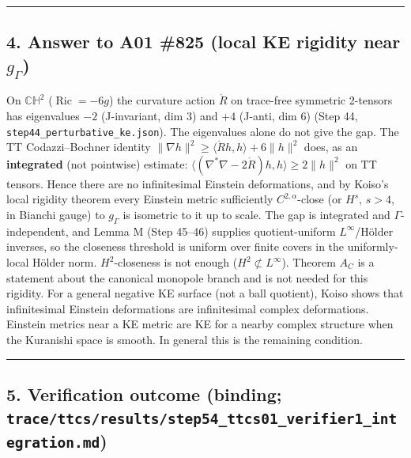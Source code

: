 \documentclass[
  10pt,
]{report}
\begin{document}
\begin{center}\rule{0.5\linewidth}{0.5pt}\end{center}

\hypertarget{answer-to-a01-825-local-ke-rigidity-near-g_gamma}{%
\subsection{\texorpdfstring{4. Answer to A01 \#825 (local KE rigidity
near
\(g_\Gamma\))}{4. Answer to A01 \#825 (local KE rigidity near g\_\textbackslash Gamma)}}\label{answer-to-a01-825-local-ke-rigidity-near-g_gamma}}

On \(\mathbb{CH}^2\) (\(\operatorname{Ric}=-6g\)) the curvature action
\(\mathring R\) on trace-free symmetric 2-tensors has eigenvalues \(-2\)
(J-invariant, dim 3) and \(+4\) (J-anti, dim 6) (Step 44,
\texttt{step44\_perturbative\_ke.json}). The eigenvalues alone do not
give the gap. The TT Codazzi--Bochner identity
\(\|\nabla h\|^2\ge\langle\mathring Rh,h\rangle+6\|h\|^2\) does, as an
\textbf{integrated} (not pointwise) estimate:
\(\langle(\nabla^*\nabla-2\mathring R)h,h\rangle\ge2\|h\|^2\) on TT
tensors. Hence there are no infinitesimal Einstein deformations, and by
Koiso's local rigidity theorem every Einstein metric sufficiently
\(C^{2,\alpha}\)-close (or \(H^s\), \(s>4\), in Bianchi gauge) to
\(g_\Gamma\) is isometric to it up to scale. The gap is integrated and
\(\Gamma\)-independent, and Lemma M (Step 45--46) supplies
quotient-uniform \(L^\infty\)/Hölder inverses, so the closeness
threshold is uniform over finite covers in the uniformly-local Hölder
norm. \(H^2\)-closeness is not enough (\(H^2\not\subset L^\infty\)).
Theorem \(A_C\) is a statement about the canonical monopole branch and
is not needed for this rigidity. For a general negative KE surface (not
a ball quotient), Koiso shows that infinitesimal Einstein deformations
are infinitesimal complex deformations. Einstein metrics near a KE
metric are KE for a nearby complex structure when the Kuranishi space is
smooth. In general this is the remaining condition.

\begin{center}\rule{0.5\linewidth}{0.5pt}\end{center}

\hypertarget{verification-outcome-binding-tracettcsresultsstep54_ttcs01_verifier1_integration.md}{%
\subsection{\texorpdfstring{5. Verification outcome (binding;
\texttt{trace/ttcs/results/step54\_ttcs01\_verifier1\_integration.md})}{5. Verification outcome (binding; trace/ttcs/results/step54\_ttcs01\_verifier1\_integration.md)}}\label{verification-outcome-binding-tracettcsresultsstep54_ttcs01_verifier1_integration.md}}
\end{document}
